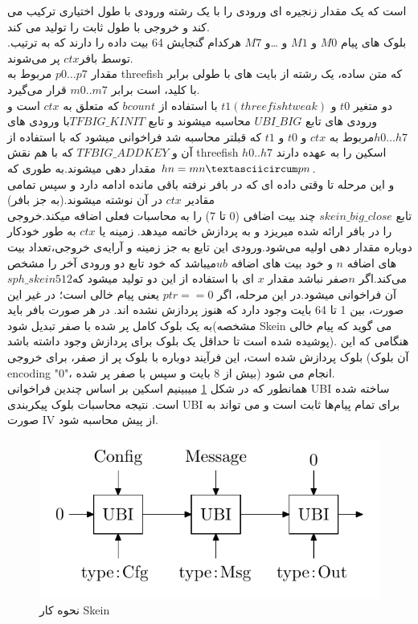  است که یک مقدار زنجیره ای ورودی را با یک رشته ورودی با طول اختیاری ترکیب می کند و خروجی با طول ثابت را تولید می کند.\\
.بلوک های پیام $M0$ و $M1$ و …و $M7$ هرکدام گنجایش 64 بیت داده را دارند که به ترتیب توسط  بافر$ ctx$ پر می‌شوند.\\
 مقدار $p0…p7$ مربوط به threefish که متن ساده، یک رشته از بایت های با طولی برابر با کلید، است برابر $m0..m7$ قرار می‌گیرد.\\
دو متغیر $t0$ و $t1(threefish tweak)$ با استفاده از $bcount$  که متعلق به $ctx$ است و ورودی های تابع  $UBI\_BIG$ محاسبه میشوند و تابع $TFBIG\_KINIT$با ورودی های $h0 …h7 $مربوط به $ctx$ و $t0$ و $t1$ که قبلتر محاسبه شد فراخوانی میشود که با استفاده از آن و $TFBIG\_ADDKEY$ که با هم نقش  threefish اسکین را به عهده دارند $h0..h7$ مقدار دهی میشوند.به طوری که $hn = mn \textasciicircum pn$.\\
 و این مرحله تا وقتی داده ای که در بافر نرفته باقی  مانده ادامه دارد و سپس تمامی مقادیر $ctx$ در آن نوشته میشوند.(به جز بافر)\\
 تابع  $skein\_big\_close$ چند بیت اضافی (0 تا 7) را به محاسبات فعلی اضافه میکند.خروجی را در بافر ارائه شده میریزد و به پردازش خاتمه میدهد. زمینه یا $ctx$ به طور خودکار دوباره مقدار دهی اولیه می‌شود.ورودی این تابع به جز زمینه و آرایه‌ی خروجی،تعداد بیت های اضافه $n$ و خود بیت های اضافه $ub $میباشد که خود تابع دو ورودی آخر را مشخص می‌کند.اگر $n $صفر نباشد مقدار $x$ ای با استفاده از این دو تولید میشود که$ sph\_skein512$ آن فراخوانی میشود.در این مرحله، اگر $ptr == 0$ یعنی پیام خالی است؛ در غیر این صورت، بین 1 تا 64 بایت وجود دارد که هنوز پردازش نشده اند. در هر صورت بافر باید به یک بلوک کامل پر شده با صفر تبدیل شود(مشخصه Skein می گوید که پیام خالی پوشیده شده است تا حداقل یک بلوک برای پردازش وجود داشته باشد).
  هنگامی که این بلوک پردازش شده است، این فرآیند دوباره با بلوک پر از صفر، برای خروجی (آن بلوک encoding "0"، بیش از 8 بایت و سپس با صفر پر شده) انجام می شود.\\
  همانطور که در شکل 
  \ref{skein_normal_hash}
   میبینیم اسکین بر اساس چندین فراخوانی UBI ساخته شده است.
نتیجه  محاسبات بلوک پیکربندی UBI برای تمام پیام‌ها ثابت است و می تواند به صورت IV از پیش محاسبه شود.
\begin{figure}[H]
\centering
\includegraphics[scale=0.7]{figs/skein_normal_hash.png}
\caption{نحوه کار Skein}
\label{skein_normal_hash}
\end{figure}

